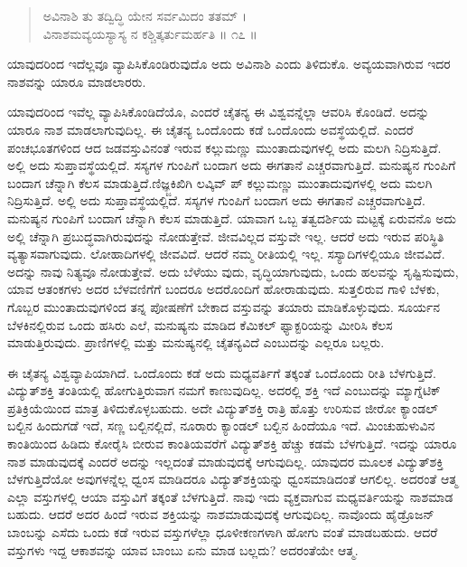 \begin{verse}
ಅವಿನಾಶಿ ತು ತದ್ವಿದ್ಧಿ ಯೇನ ಸರ್ವಮಿದಂ ತತಮ್ ।\\ವಿನಾಶಮವ್ಯಯಸ್ಯಾಸ್ಯ ನ ಕಶ್ಚಿತ್ಕರ್ತುಮರ್ಹತಿ \num{॥ ೧೭ ॥}
\end{verse}

{\small ಯಾವುದರಿಂದ ಇದೆಲ್ಲವೂ ವ್ಯಾಪಿಸಿಕೊಂಡಿರುವುದೊ ಅದು ಅವಿನಾಶಿ ಎಂದು ತಿಳಿದುಕೊ. ಅವ್ಯಯವಾಗಿರುವ ಇದರ ನಾಶವನ್ನು ಯಾರೂ ಮಾಡಲಾರರು.}

ಯಾವುದರಿಂದ ಇವೆಲ್ಲ ವ್ಯಾಪಿಸಿಕೊಂಡಿದೆಯೊ, ಎಂದರೆ ಚೈತನ್ಯ ಈ ವಿಶ್ವವನ್ನೆಲ್ಲಾ ಆವರಿಸಿ ಕೊಂಡಿದೆ. ಅದನ್ನು ಯಾರೂ ನಾಶ ಮಾಡಲಾಗುವುದಿಲ್ಲ. ಈ ಚೈತನ್ಯ ಒಂದೊಂದು ಕಡೆ ಒಂದೊಂದು ಅವಸ್ಥೆಯಲ್ಲಿದೆ. ಎಂದರೆ ಪಂಚಭೂತಗಳಿಂದ ಆದ ಜಡವಸ್ತುವಿನಂತೆ ಇರುವ ಕಲ್ಲುಮಣ್ಣು ಮುಂತಾದುವುಗಳಲ್ಲಿ ಅದು ಮಲಗಿ ನಿದ್ರಿಸುತ್ತಿದೆ. ಅಲ್ಲಿ ಅದು ಸುಪ್ತಾವಸ್ಥೆಯಲ್ಲಿದೆ. ಸಸ್ಯಗಳ ಗುಂಪಿಗೆ ಬಂದಾಗ ಅದು ಈಗತಾನೆ ಎಚ್ಚರವಾಗುತ್ತಿದೆ. ಮನುಷ್ಯನ ಗುಂಪಿಗೆ ಬಂದಾಗ ಚೆನ್ನಾಗಿ ಕೆಲಸ ಮಾಡುತ್ತಿದೆ.ಣಿಜ್ಞ್ಜಕಿಖಿಗಿ ಲವ್ಕಿವ್ ಪ್ ಕಲ್ಲುಮಣ್ಣು ಮುಂತಾದುವುಗಳಲ್ಲಿ ಅದು ಮಲಗಿ ನಿದ್ರಿಸುತ್ತಿದೆ. ಅಲ್ಲಿ ಅದು ಸುಪ್ತಾವಸ್ಥೆಯಲ್ಲಿದೆ. ಸಸ್ಯಗಳ ಗುಂಪಿಗೆ ಬಂದಾಗ ಅದು ಈಗತಾನೆ ಎಚ್ಚರವಾಗುತ್ತಿದೆ. ಮನುಷ್ಯನ ಗುಂಪಿಗೆ ಬಂದಾಗ ಚೆನ್ನಾಗಿ ಕೆಲಸ ಮಾಡುತ್ತಿದೆ. ಯಾವಾಗ ಒಬ್ಬ ತತ್ವದರ್ಶಿಯ ಮಟ್ಟಕ್ಕೆ ಏರುವನೊ ಅದು ಅಲ್ಲಿ ಚೆನ್ನಾಗಿ ಪ್ರಬುದ್ಧವಾಗಿರುವುದನ್ನು ನೋಡುತ್ತೇವೆ. ಜೀವವಿಲ್ಲದ ವಸ್ತುವೇ ಇಲ್ಲ. ಆದರೆ ಅದು ಇರುವ ಪರಿಸ್ಥಿತಿ ವ್ಯತ್ಯಾಸವಾಗುವುದು. ಲೋಹಾದಿಗಳಲ್ಲಿ ಜೀವವಿದೆ. ಆದರೆ ನಮ್ಮ ರೀತಿಯಲ್ಲಿ ಇಲ್ಲ. ಸಸ್ಯಾದಿಗಳಲ್ಲಿಯೂ ಜೀವವಿದೆ. ಅದನ್ನು ನಾವು ನಿತ್ಯವೂ ನೋಡುತ್ತೇವೆ. ಅದು ಬೆಳೆಯು ವುದು, ವೃದ್ಧಿಯಾಗುವುದು, ಒಂದು ಹಲವನ್ನು ಸೃಷ್ಟಿಸುವುದು, ಯಾವ ಆತಂಕಗಳು ಅದರ ಬೆಳವಣಿಗೆಗೆ ಬಂದರೂ ಅದರೊಂದಿಗೆ ಹೋರಾಡುವುದು. ಸುತ್ತಲಿರುವ ಗಾಳಿ ಬೆಳಕು, ಗೊಬ್ಬರ ಮುಂತಾದುವುಗಳಿಂದ ತನ್ನ ಪೋಷಣೆಗೆ ಬೇಕಾದ ವಸ್ತುವನ್ನು ತಯಾರು ಮಾಡಿಕೊಳ್ಳುವುದು. ಸೂರ್ಯನ ಬೆಳಕಿನಲ್ಲಿರುವ ಒಂದು ಹಸಿರು ಎಲೆ, ಮನುಷ್ಯನು ಮಾಡಿದ ಕೆಮಿಕಲ್ ಫ್ಯಾಕ್ಟರಿಯನ್ನು ಮೀರಿಸಿ ಕೆಲಸ ಮಾಡುತ್ತಿರುವುದು. ಪ್ರಾಣಿಗಳಲ್ಲಿ ಮತ್ತು ಮನುಷ್ಯನಲ್ಲಿ ಚೈತನ್ಯವಿದೆ ಎಂಬುದನ್ನು ಎಲ್ಲರೂ ಬಲ್ಲರು.

ಈ ಚೈತನ್ಯ ವಿಶ್ವವ್ಯಾಪಿಯಾಗಿದೆ. ಒಂದೊಂದು ಕಡೆ ಅದು ಮಧ್ಯವರ್ತಿಗೆ ತಕ್ಕಂತೆ ಒಂದೊಂದು ರೀತಿ ಬೆಳಗುತ್ತಿದೆ. ವಿದ್ಯುತ್​ಶಕ್ತಿ ತಂತಿಯಲ್ಲಿ ಹೋಗುತ್ತಿರುವಾಗ ನಮಗೆ ಕಾಣುವುದಿಲ್ಲ. ಅದರಲ್ಲಿ ಶಕ್ತಿ ಇದೆ ಎಂಬುದನ್ನು ಮ್ಯಾಗ್ನೆಟಿಕ್ ಪ್ರತಿಕ್ರಿಯೆಯಿಂದ ಮಾತ್ರ ತಿಳಿದುಕೊಳ್ಳಬಹುದು. ಅದೇ ವಿದ್ಯುತ್​ಶಕ್ತಿ ರಾತ್ರಿ ಹೊತ್ತು ಉರಿಸುವ ಜೀರೋ ಕ್ಯಾಂಡಲ್ ಬಲ್ಬಿನ ಹಿಂದುಗಡೆ ಇದೆ, ಸಣ್ಣ ಬಲ್ಬಿನಲ್ಲಿದೆ, ನೂರಾರು ಕ್ಯಾಂಡಲ್ ಬಲ್ಬಿನ ಹಿಂದೆಯೂ ಇದೆ. ಮಿಂಚುಹುಳುವಿನ ಕಾಂತಿಯಿಂದ ಹಿಡಿದು ಕೋರೈಸಿ ಬೀರುವ ಕಾಂತಿಯವರೆಗೆ ವಿದ್ಯುತ್​ಶಕ್ತಿ ಹೆಚ್ಚು ಕಡಮೆ ಬೆಳಗುತ್ತಿದೆ. ಇದನ್ನು ಯಾರೂ ನಾಶ ಮಾಡುವುದಕ್ಕೆ ಎಂದರೆ ಅದನ್ನು ಇಲ್ಲದಂತೆ ಮಾಡುವುದಕ್ಕೆ ಆಗುವುದಿಲ್ಲ. ಯಾವುದರ ಮೂಲಕ ವಿದ್ಯುತ್​ಶಕ್ತಿ ಬೆಳಗುತ್ತಿದೆಯೋ ಅವುಗಳನ್ನೆಲ್ಲ ಧ್ವಂಸ ಮಾಡಿದರೂ ವಿದ್ಯುತ್​ಶಕ್ತಿಯನ್ನು ಧ್ವಂಸಮಾಡಿದಂತೆ ಆಗಲಿಲ್ಲ. ಅದರಂತೆ ಆತ್ಮ ಎಲ್ಲಾ ವಸ್ತುಗಳಲ್ಲಿ ಆಯಾ ವಸ್ತುವಿಗೆ ತಕ್ಕಂತೆ ಬೆಳಗುತ್ತಿದೆ. ನಾವು ಇದು ವ್ಯಕ್ತವಾಗುವ ಮಧ್ಯವರ್ತಿಯನ್ನು ನಾಶಮಾಡ ಬಹುದು. ಆದರೆ ಅದರ ಹಿಂದೆ ಇರುವ ಶಕ್ತಿಯನ್ನು ನಾಶಮಾಡುವುದಕ್ಕೆ ಆಗುವುದಿಲ್ಲ. ನಾವೊಂದು ಹೈಡ್ರೊಜನ್ ಬಾಂಬನ್ನು ಎಸೆದು ಒಂದು ಕಡೆ ಇರುವ ವಸ್ತುಗಳೆಲ್ಲಾ ಧೂಳೀಕಣಗಳಾಗಿ ಹೋಗು ವಂತೆ ಮಾಡಬಹುದು. ಆದರೆ ವಸ್ತುಗಳು ಇದ್ದ ಆಕಾಶವನ್ನು ಯಾವ ಬಾಂಬು ಏನು ಮಾಡ ಬಲ್ಲದು? ಅದರಂತೆಯೇ ಆತ್ಮ.

